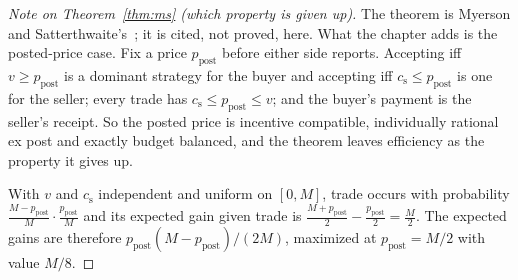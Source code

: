 \documentclass[11pt,a4paper]{article}
\theoremstyle{definition}
\theoremstyle{definition}
\theoremstyle{remark}
\begin{document}
\begin{proof}[Note on Theorem~\ref{thm:ms} (which property is given up)]
\setlength{\parskip}{4pt plus 1pt}
The theorem is Myerson and Satterthwaite's~; it is cited,
not proved, here. What the chapter adds is the posted-price case. Fix a price
$p_{\mathrm{post}}$ before either side reports. Accepting iff $v\ge p_{\mathrm{post}}$ is a dominant
strategy for the buyer and accepting iff $c_{\mathrm s}\le p_{\mathrm{post}}$ is one for the
seller; every trade has $c_{\mathrm s}\le p_{\mathrm{post}}\le v$; and the buyer's payment is the
seller's receipt. So the posted price is incentive compatible, individually
rational ex post and exactly budget balanced, and the theorem leaves
efficiency as the property it gives up.

With $v$ and $c_{\mathrm s}$ independent and uniform on $[0,M]$, trade
occurs with probability $\tfrac{M-p_{\mathrm{post}}}{M}\cdot\tfrac{p_{\mathrm{post}}}{M}$ and its
expected gain given trade is $\tfrac{M+p_{\mathrm{post}}}{2}-\tfrac{p_{\mathrm{post}}}{2}=\tfrac M2$.
The expected gains are therefore $p_{\mathrm{post}}(M-p_{\mathrm{post}})/(2M)$, maximized at
$p_{\mathrm{post}}=M/2$ with value $M/8$.
\end{proof}
\pdprintsolutions
\end{document}
